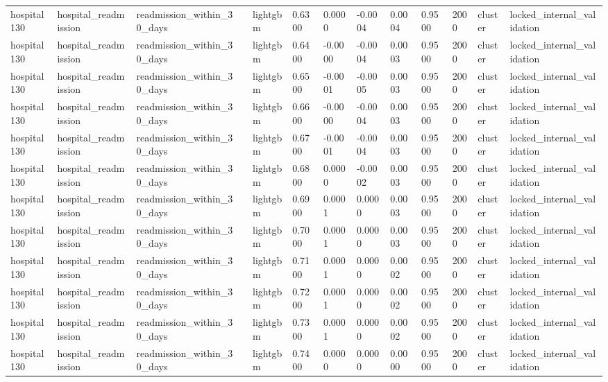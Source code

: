 \begin{tabular}{lllllllllllll}
hospital130 & hospital\_readmission & readmission\_within\_30\_days &  & lightgbm & 0.6300 & 0.0000 & -0.0004 & 0.0004 & 0.9500 & 2000 & cluster & locked\_internal\_validation \\
hospital130 & hospital\_readmission & readmission\_within\_30\_days &  & lightgbm & 0.6400 & -0.0000 & -0.0004 & 0.0003 & 0.9500 & 2000 & cluster & locked\_internal\_validation \\
hospital130 & hospital\_readmission & readmission\_within\_30\_days &  & lightgbm & 0.6500 & -0.0001 & -0.0005 & 0.0003 & 0.9500 & 2000 & cluster & locked\_internal\_validation \\
hospital130 & hospital\_readmission & readmission\_within\_30\_days &  & lightgbm & 0.6600 & -0.0000 & -0.0004 & 0.0003 & 0.9500 & 2000 & cluster & locked\_internal\_validation \\
hospital130 & hospital\_readmission & readmission\_within\_30\_days &  & lightgbm & 0.6700 & -0.0001 & -0.0004 & 0.0003 & 0.9500 & 2000 & cluster & locked\_internal\_validation \\
hospital130 & hospital\_readmission & readmission\_within\_30\_days &  & lightgbm & 0.6800 & 0.0000 & -0.0002 & 0.0003 & 0.9500 & 2000 & cluster & locked\_internal\_validation \\
hospital130 & hospital\_readmission & readmission\_within\_30\_days &  & lightgbm & 0.6900 & 0.0001 & 0.0000 & 0.0003 & 0.9500 & 2000 & cluster & locked\_internal\_validation \\
hospital130 & hospital\_readmission & readmission\_within\_30\_days &  & lightgbm & 0.7000 & 0.0001 & 0.0000 & 0.0003 & 0.9500 & 2000 & cluster & locked\_internal\_validation \\
hospital130 & hospital\_readmission & readmission\_within\_30\_days &  & lightgbm & 0.7100 & 0.0001 & 0.0000 & 0.0002 & 0.9500 & 2000 & cluster & locked\_internal\_validation \\
hospital130 & hospital\_readmission & readmission\_within\_30\_days &  & lightgbm & 0.7200 & 0.0001 & 0.0000 & 0.0002 & 0.9500 & 2000 & cluster & locked\_internal\_validation \\
hospital130 & hospital\_readmission & readmission\_within\_30\_days &  & lightgbm & 0.7300 & 0.0001 & 0.0000 & 0.0002 & 0.9500 & 2000 & cluster & locked\_internal\_validation \\
hospital130 & hospital\_readmission & readmission\_within\_30\_days &  & lightgbm & 0.7400 & 0.0000 & 0.0000 & 0.0000 & 0.9500 & 2000 & cluster & locked\_internal\_validation \\

\end{tabular}
